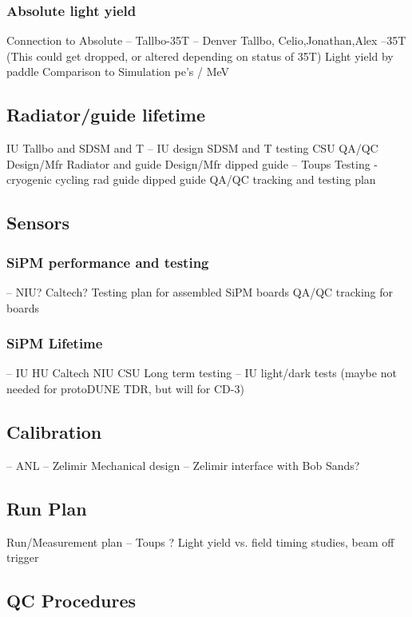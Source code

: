 \subsubsection{ Absolute light yield}
     Connection to Absolute -- Tallbo-35T  -- Denver Tallbo, Celio,Jonathan,Alex --35T
     (This could get dropped, or altered depending on status of 35T)
     Light yield by paddle
     Comparison to Simulation
     pe's / MeV 

\subsection{Radiator/guide lifetime}
     IU Tallbo and SDSM and T  -- IU design SDSM and T testing  CSU QA/QC
     Design/Mfr Radiator and guide
     Design/Mfr dipped guide -- Toups
     Testing - cryogenic cycling 
          rad
          guide
          dipped guide
     QA/QC tracking and testing plan  

\subsection{Sensors}

\subsubsection{SiPM performance and testing}
      -- NIU? Caltech?
     Testing plan for assembled SiPM boards
     QA/QC tracking for boards     

\subsubsection{SiPM Lifetime}
      -- IU HU Caltech NIU CSU 
     Long term testing -- IU light/dark tests     
     (maybe not needed for protoDUNE TDR, but will for CD-3)



\subsection{Calibration} -- ANL -- Zelimir
     Mechanical design -- Zelimir interface with Bob Sands?

\subsection{Run Plan}
     Run/Measurement plan  -- Toups ?
     Light yield vs. field
     timing studies,
     beam off trigger

\subsection{QC Procedures}



